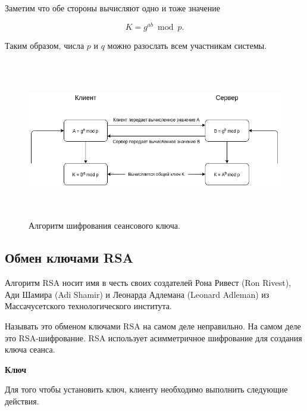    	
   Заметим что обе стороны вычисляют одно и тоже значение

	\begin{equation}
		K = g^{ab} \bmod p.
		\label{eq5:ref}
	\end{equation}

	Таким образом, числа \(p\) и \(q\) можно разослать всем участникам системы.
	
	\begin{figure}[h!]
		\centering
		\includegraphics[width=\textwidth,height=7cm,keepaspectratio]{DH.png}
		\caption{Алгоритм шифрования сеансового ключа.} \label{fig:hd}
	\end{figure}
   
   	\subsection{Обмен ключами RSA}
   	
   	
   	Алгоритм RSA носит имя в честь своих создателей Рона Ривест (Ron Rivest), Ади Шамира (Adi Shamir) и Леонарда Адлемана (Leonard Adleman) из Массачусетского технологического института. 
   	
   	Называть это обменом ключами RSA на самом деле неправильно. На самом деле это RSA-шифрование. RSA использует асимметричное шифрование для создания ключа сеанса. 
   	
   	
   	\textbf{Ключ}
   	
   	Для того чтобы установить ключ, клиенту необходимо выполнить следующие действия.
   	
